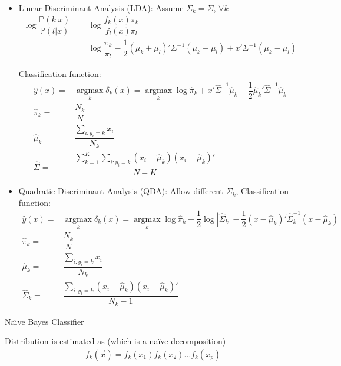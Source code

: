 \begin{itemize}[topsep=2pt,itemsep=0pt]
    \item Linear Discriminant Analysis (LDA): Assume $ \Sigma _k=\Sigma  $, $ \forall k $
    \begin{align}
        \log\dfrac{\mathbb{P}\left( k|x \right) }{\mathbb{P}\left( l|x \right) }=&\log\dfrac{f_k(x)\pi_k}{f_l(x)\pi_l}\\
        =& \log\dfrac{\pi_k}{\pi_l}-\dfrac{1}{2}(\mu _k+\mu _l)'\Sigma ^{-1}(\mu _k-\mu _l)+x'\Sigma ^{-1}(\mu _k-\mu _l)
    \end{align}

    Classification function:
    \begin{align}
        \hat{y}(x)=&\mathop{\arg\max}\limits_{k}\delta _k(x)=\mathop{\arg\max}\limits_{k} \log\hat{\pi}_k+x'\hat{\Sigma} ^{-1}\hat{\mu } _k -\dfrac{1}{2}\hat{\mu }_k'\hat{\Sigma }^{-1}\hat{\mu }_k\\
        \hat{\pi}_k=&\dfrac{N_k}{N}\\
        \hat{\mu }_k=&\dfrac{\sum_{i:y_i=k }x_i}{N_k}\\
        \hat{\Sigma }=&\dfrac{\sum_{k=1}^K\sum_{i:y_i=k}(x_i-\hat{\mu }_k)(x_i-\hat{\mu }_k)'}{N-K}        
    \end{align}
    \item Quadratic Discriminant Analysis (QDA): Allow different $ \Sigma _k $, Classification function:
    \begin{align}
        \hat{y}(x)=&\mathop{\arg\max}\limits_{k}\delta _k(x)=\mathop{\arg\max}\limits_{k} \log\hat{\pi}_k-\dfrac{1}{2} \log|\hat{\Sigma }_k|-\dfrac{1}{2}(x-\hat{\mu }_k)'\hat{\Sigma }_k^{-1}(x-\hat{\mu }_k)\\
        \hat{\pi}_k=&\dfrac{N_k}{N}\\
        \hat{\mu }_k=&\dfrac{\sum_{i:y_i=k }x_i}{N_k}\\
        \hat{\Sigma }_k=&\dfrac{\sum_{i:y_i=k}(x_i-\hat{\mu }_k)(x_i-\hat{\mu }_k)'}{N_k-1}    
    \end{align}  

\end{itemize}

    
\begin{point}
    Na\"\i ve Bayes Classifier 
\end{point}

    Distribution is estimated as (which is a naïve decomposition)
    \begin{align}
        f_k(\vec{x})=f_k(x_1)f_k(x_2)\ldots f_k(x_p) 
    \end{align}
    
